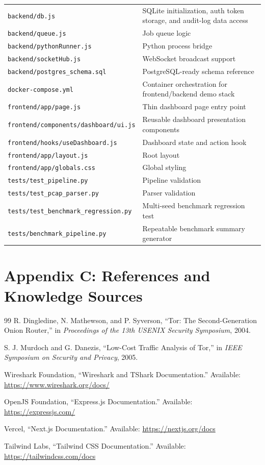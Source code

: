 \documentclass[12pt,a4paper]{report}
\begin{document}
\begin{longtable}{p{5cm}p{8.5cm}}
\texttt{backend/db.js} & SQLite initialization, auth token storage, and audit-log data access \\
\texttt{backend/queue.js} & Job queue logic \\
\texttt{backend/pythonRunner.js} & Python process bridge \\
\texttt{backend/socketHub.js} & WebSocket broadcast support \\
\texttt{backend/postgres\_schema.sql} & PostgreSQL-ready schema reference \\
\texttt{docker-compose.yml} & Container orchestration for frontend/backend demo stack \\
\texttt{frontend/app/page.js} & Thin dashboard page entry point \\
\texttt{frontend/components/dashboard/ui.js} & Reusable dashboard presentation components \\
\texttt{frontend/hooks/useDashboard.js} & Dashboard state and action hook \\
\texttt{frontend/app/layout.js} & Root layout \\
\texttt{frontend/app/globals.css} & Global styling \\
\texttt{tests/test\_pipeline.py} & Pipeline validation \\
\texttt{tests/test\_pcap\_parser.py} & Parser validation \\
\texttt{tests/test\_benchmark\_regression.py} & Multi-seed benchmark regression test \\
\texttt{tests/benchmark\_pipeline.py} & Repeatable benchmark summary generator \\
\bottomrule
\end{longtable}

\chapter*{Appendix C: References and Knowledge Sources}
\begin{thebibliography}{99}
R. Dingledine, N. Mathewson, and P. Syverson, ``Tor: The Second-Generation Onion Router,'' in \textit{Proceedings of the 13th USENIX Security Symposium}, 2004.

S. J. Murdoch and G. Danezis, ``Low-Cost Traffic Analysis of Tor,'' in \textit{IEEE Symposium on Security and Privacy}, 2005.

Wireshark Foundation, ``Wireshark and TShark Documentation.'' Available: \url{https://www.wireshark.org/docs/}

OpenJS Foundation, ``Express.js Documentation.'' Available: \url{https://expressjs.com/}

Vercel, ``Next.js Documentation.'' Available: \url{https://nextjs.org/docs}

Tailwind Labs, ``Tailwind CSS Documentation.'' Available: \url{https://tailwindcss.com/docs}
\end{thebibliography}
\end{document}

